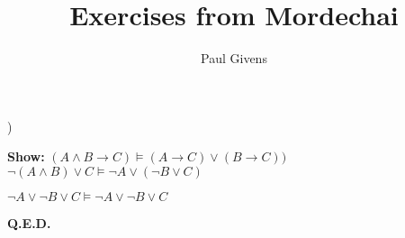 \documentclass[letterpaper]{article}
\title{Exercises from Mordechai}
\author{Paul Givens}
\begin{document}
) 

\textbf{Show:}
$ (A\wedge B\rightarrow C)\vDash (A\rightarrow C)\vee (B\rightarrow C)) $
\\[1ex]

$ \neg(A \wedge B) \vee C \vDash \neg A \vee (\neg B \vee C) $

$ \neg A \vee \neg B \vee C \vDash \neg A \vee \neg B \vee C$ 

\textbf{Q.E.D.}
\end{document}
